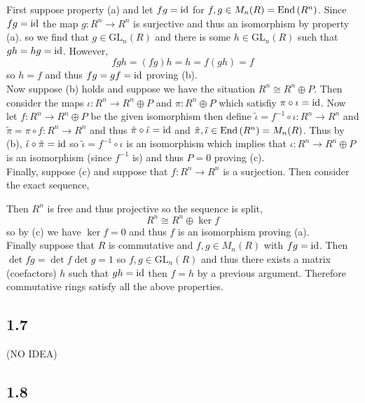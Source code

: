 \documentclass[12pt]{article}
\renewcommand{\GL}{\mathrm{GL}}
\begin{document}
First suppose property (a) and let $f g = \mathrm{id}$ for $f, g \in M_n(R) = \mathrm{End} \left( R^n \right)$. Since $f g = \mathrm{id}$ the map $g : R^n \to R^n$ is surjective and thus an isomorphism by property (a). so we find that $g \in \GL_n(R)$ and there is some $h \in \GL_n(R)$ such that $g h = hg = \mathrm{id}$. However,
\[ f g h = (fg)h = h = f (gh) = f \]
so $h = f$ and thus $fg = gf = \mathrm{id}$ proving (b).
\bigskip\\
Now suppose (b) holds and suppose we have the situation $R^n \cong R^n \oplus P$. Then consider the maps $\iota : R^n \to R^n \oplus P$ and $\pi : R^n \oplus P$ which satisfiy $\pi \circ \iota = \mathrm{id}$. Now let $f : R^n \to R^n \oplus P$ be the given isomorphism then define $\tilde{\iota} = f^{-1} \circ \iota : R^n \to R^n$ and $\tilde{\pi} = \pi \circ f : R^n \to R^n$ and thus $\tilde{\pi} \circ \tilde{\iota} = \mathrm{id}$ and $\tilde{\pi}, \tilde{\iota} \in \mathrm{End} \left( R^n \right) = M_n(R)$.
Thus by (b), $\tilde{\iota} \circ \tilde{\pi} = \mathrm{id}$ so $\tilde{\iota} = f^{-1} \circ \iota$ is an isomorphism which implies that $\iota : R^n \to R^n \oplus P$ is an isomorphism (since $f^{-1}$ is) and thus $P = 0$ proving (c).
\bigskip\\
Finally, suppose (c) and suppose that $f : R^n \to R^n$ is a surjection. Then consider the exact sequence,
\begin{center}
\end{center}
Then $R^n$ is free and thus projective so the sequence is split,
\[ R^n \cong R^n \oplus \ker{f} \]
so by (c) we have $\ker{f} = 0$ and thus $f$ is an isomorphism proving (a).
\bigskip\\
Finally suppose that $R$ is commutative and $f,g \in M_n(R)$ with $fg = \mathrm{id}$. Then $\det{fg} = \det{f} \det{g} = 1$ so $f,g \in \GL_n(R)$ and thus there exists a matrix (coefactors) $h$ such that $gh = \mathrm{id}$ then $f = h$ by a previous argument. Therefore commutative rings satisfy all the above properties. 

\subsection{1.7}

(NO IDEA)

\subsection{1.8}
\end{document}
